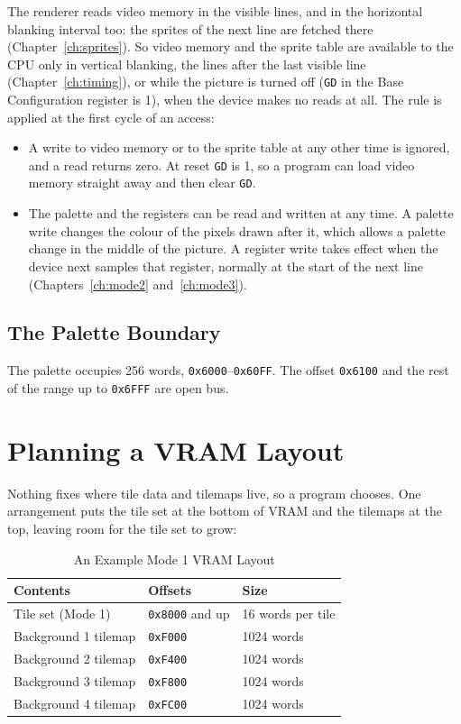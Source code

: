 The renderer reads video memory in the visible lines, and in the horizontal blanking interval too: the sprites of the
next line are fetched there (Chapter~\ref{ch:sprites}). So video memory and the sprite table are available to the CPU
only in vertical blanking, the lines after the last visible line (Chapter~\ref{ch:timing}), or while the picture is
turned off (\texttt{GD} in the Base Configuration register is 1), when the device makes no reads at all. The rule is
applied at the first cycle of an access:

\begin{itemize}
	\item A write to video memory or to the sprite table at any other time is ignored, and a read returns zero. At reset
	      \texttt{GD} is 1, so a program can load video memory straight away and then clear \texttt{GD}.
	\item The palette and the registers can be read and written at any time. A palette write changes the colour of the pixels
	      drawn after it, which allows a palette change in the middle of the picture. A register write takes effect when the
	      device next samples that register, normally at the start of the next line (Chapters~\ref{ch:mode2} and~\ref{ch:mode3}).
\end{itemize}

\subsection{The Palette Boundary}
\label{sec:palette-edge}

The palette occupies 256 words, \texttt{0x6000}--\texttt{0x60FF}. The offset \texttt{0x6100} and the rest of the range
up to \texttt{0x6FFF} are open bus.

\section{Planning a VRAM Layout}

Nothing fixes where tile data and tilemaps live, so a program chooses. One arrangement puts the tile set at the bottom
of VRAM and the tilemaps at the top, leaving room for the tile set to grow:

\begin{table}[H]
	\centering
	\begin{tabular}{lll}
		\toprule
		\textbf{Contents}    & \textbf{Offsets}       & \textbf{Size}     \\
		\midrule
		Tile set (Mode 1)    & \texttt{0x8000} and up & 16 words per tile \\
		Background 1 tilemap & \texttt{0xF000}        & 1024 words        \\
		Background 2 tilemap & \texttt{0xF400}        & 1024 words        \\
		Background 3 tilemap & \texttt{0xF800}        & 1024 words        \\
		Background 4 tilemap & \texttt{0xFC00}        & 1024 words        \\
		\bottomrule
	\end{tabular}
	\caption{An Example Mode 1 VRAM Layout}
	\label{tab:vram-layout}
\end{table}

